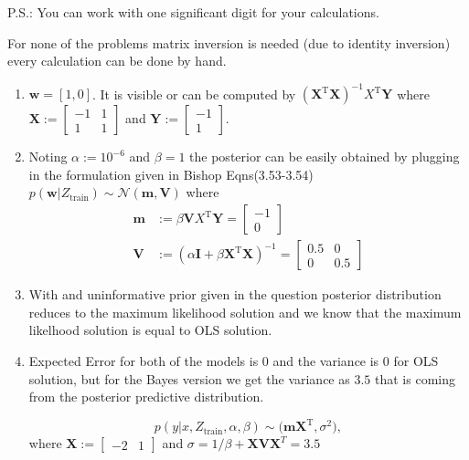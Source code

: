 \documentclass{tran-l}
\theoremstyle{remark}
\numberwithin{equation}{section}
\begin{document}
P.S.: You can work with one significant digit for your calculations.

\so For none of the problems matrix inversion is needed (due to identity inversion) every calculation can be done by hand. 

\begin{enumerate}[label=\alph*]
  \item $\mathbf{w}=[1,0]$. It is visible or can be computed by $(\mathbf{X}^\text{T}\mathbf{X})^{-1}X^\text{T}\mathbf{Y}$ where $\mathbf{X}:=\begin{bmatrix}-1 & 1 \\1 & 1  \end{bmatrix}$ and $\mathbf{Y}:=\begin{bmatrix}-1\\1\end{bmatrix}$. 
  \item Noting $\alpha:=10^{-6}$ and $\beta=1$ the posterior can be easily obtained by plugging in the formulation given in Bishop Eqns(3.53-3.54) $p(\mathbf{w}|Z_\text{train})\sim\mathcal{N}(\mathbf{m}, \mathbf{V})$ where
  \begin{align*}
    \mathbf{m} &:= \beta \mathbf{V}X^\text{T}\mathbf{Y} = \begin{bmatrix}-1\\0\end{bmatrix} \\
    \mathbf{V} &:= (\alpha \mathbf{I} + \beta \mathbf{X}^\text{T}\mathbf{X})^{-1} = \begin{bmatrix}0.5 & 0 \\0 & 0.5  \end{bmatrix}
  \end{align*}
  \item With and uninformative prior given in the question posterior distribution reduces to the maximum likelihood solution and we know that the maximum likelhood solution is equal to OLS solution.
  \item Expected Error for both of the models is $0$ and the variance is $0$ for OLS solution, but for the Bayes version we get the variance as $3.5$ that is coming from the posterior predictive distribution.

\begin{equation*}
  p(y|x,Z_\text{train},\alpha,\beta) \sim \mathcal(\mathbf{m}\mathbf{X}^\text{T}, \sigma^2),
\end{equation*}
where $\mathbf{X}:=\begin{bmatrix} -2 & 1 \end{bmatrix}$ and $\sigma = 1/\beta+\mathbf{X}\mathbf{V}\mathbf{X}^{T}=3.5$
  
\end{enumerate}
\end{document}
